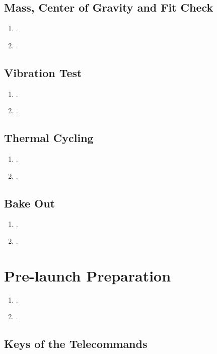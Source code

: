 \subsection{Mass, Center of Gravity and Fit Check}

\begin{enumerate}
    \item .
    \item .
\end{enumerate}

\subsection{Vibration Test}

\begin{enumerate}
    \item .
    \item .
\end{enumerate}

\subsection{Thermal Cycling}

\begin{enumerate}
    \item .
    \item .
\end{enumerate}

\subsection{Bake Out}

\begin{enumerate}
    \item .
    \item .
\end{enumerate}

\section{Pre-launch Preparation}

\begin{enumerate}
    \item .
    \item .
\end{enumerate}

\subsection{Keys of the Telecommands}


